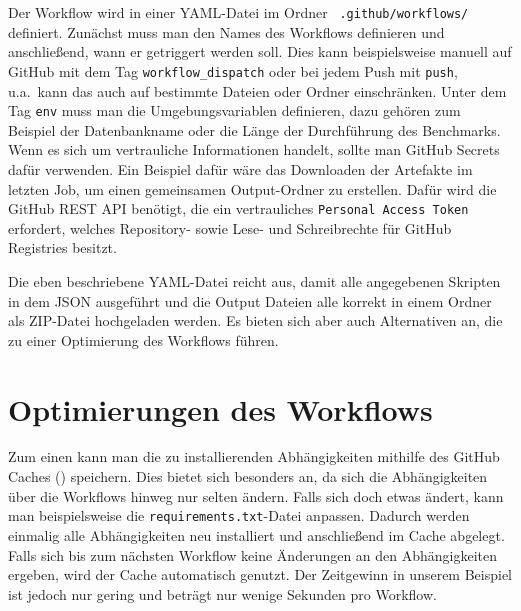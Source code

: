 Der Workflow wird in einer YAML-Datei im Ordner ~\texttt{.github/workflows/} definiert.
Zunächst muss man den Names des Workflows definieren und anschließend, wann er getriggert werden soll.
Dies kann beispielsweise manuell auf GitHub mit dem Tag \texttt{workflow\_dispatch} oder bei jedem Push mit \texttt{push}, u.a.\ kann das auch auf bestimmte Dateien oder Ordner einschränken.
Unter dem Tag \texttt{env} muss man die Umgebungsvariablen definieren, dazu gehören zum Beispiel der Datenbankname oder die Länge der Durchführung des Benchmarks.
Wenn es sich um vertrauliche Informationen handelt, sollte man GitHub Secrets dafür verwenden.
Ein Beispiel dafür wäre das Downloaden der Artefakte im letzten Job, um einen gemeinsamen Output-Ordner zu erstellen.
Dafür wird die GitHub REST API benötigt, die ein vertrauliches \texttt{Personal Access Token} erfordert, welches Repository- sowie Lese- und Schreibrechte für GitHub Registries besitzt.

\vspace{-5pt}

\vspace{-5pt}

Die eben beschriebene YAML-Datei reicht aus, damit alle angegebenen Skripten in dem JSON ausgeführt und die Output Dateien alle korrekt in einem Ordner als ZIP-Datei hochgeladen werden.
Es bieten sich aber auch Alternativen an, die zu einer Optimierung des Workflows führen.

\section{Optimierungen des Workflows}\label{sec:optimierungen-des-workflows}

Zum einen kann man die zu installierenden Abhängigkeiten mithilfe des GitHub Caches (\cite{github_cache_doku}) speichern.
Dies bietet sich besonders an, da sich die Abhängigkeiten über die Workflows hinweg nur selten ändern.
Falls sich doch etwas ändert, kann man beispielsweise die \texttt{require\allowbreak ments.txt}-Datei anpassen.
Dadurch werden einmalig alle Abhängigkeiten neu installiert und anschließend im Cache abgelegt.
Falls sich bis zum nächsten Workflow keine Änderungen an den Abhängigkeiten ergeben, wird der Cache automatisch genutzt.
Der Zeitgewinn in unserem Beispiel ist jedoch nur gering und beträgt nur wenige Sekunden pro Workflow.

